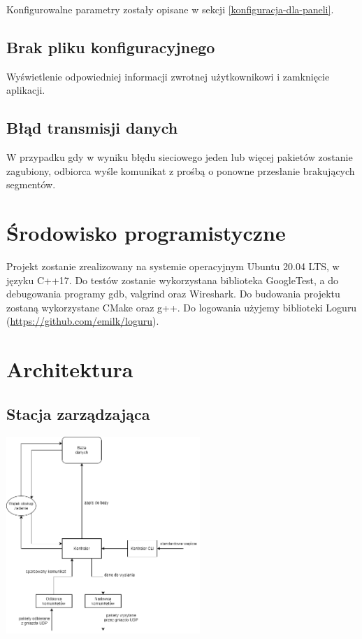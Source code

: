 \documentclass[12pt, a4paper]{article}
\begin{document}
Konfigurowalne parametry zostały opisane w sekcji \ref{konfiguracja-dla-paneli}.

\hypertarget{brak-pliku-konfiguracyjnego}{%
\subsection{Brak pliku konfiguracyjnego}\label{brak-pliku-konfiguracyjnego}}

Wyświetlenie odpowiedniej informacji zwrotnej użytkownikowi i zamknięcie
aplikacji.

\hypertarget{bux142ux105d-transmisji-danych}{%
\subsection{Błąd transmisji danych}\label{bux142ux105d-transmisji-danych}}

W przypadku gdy w wyniku błędu sieciowego jeden lub więcej pakietów
zostanie zagubiony, odbiorca wyśle komunikat z prośbą o ponowne
przesłanie brakujących segmentów.

\hypertarget{ux15brodowisko-programistyczne}{%
\section{Środowisko programistyczne}\label{ux15brodowisko-programistyczne}}

Projekt zostanie zrealizowany na systemie operacyjnym Ubuntu 20.04 LTS,
w języku C++17. Do testów zostanie wykorzystana biblioteka GoogleTest, a
do debugowania programy gdb, valgrind oraz Wireshark. Do budowania
projektu zostaną wykorzystane CMake oraz g++. Do logowania użyjemy
biblioteki Loguru (\href{https://github.com/emilk/loguru}{https://github.com/emilk/loguru}).

\hypertarget{architektura}{%
\section{Architektura}\label{architektura}}

\hypertarget{stacja-zarzux105dzajux105ca-1}{%
\subsection{Stacja zarządzająca}\label{stacja-zarzux105dzajux105ca-1}}

\begin{center}
\includegraphics[width=0.55\textwidth]{9JdQG4k}
\end{center}
\end{document}
